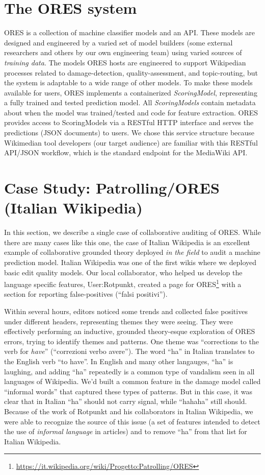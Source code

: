 \documentclass{sigchi-ext}
\begin{document}
\section{The ORES system}

ORES is a collection of machine classifier models and an API.  These models are designed and engineered by a varied set of model builders (some external researchers and others by our own engineering team) using varied sources of \emph{training data}.  The models ORES hosts are engineered to support Wikipedian processes related to damage-detection, quality-assessment, and topic-routing, but the system is adaptable to a wide range of other models. To make these models available for users, ORES implements a containerized \emph{ScoringModel}, representing a fully trained and tested prediction model.  All \emph{ScoringModels} contain metadata about when the model was trained/tested and code for feature extraction. ORES provides access to ScoringModels via a RESTful HTTP interface and serves the predictions (JSON documents) to users.  We chose this service structure because Wikimedian tool developers (our target audience) are familiar with this RESTful API/JSON workflow, which is the standard endpoint for the MediaWiki API.

\section{Case Study: Patrolling/ORES (Italian Wikipedia)}
In this section, we describe a single case of collaborative auditing of ORES.  While there are many cases like this one, the case of Italian Wikipedia is an excellent example of collaborative grounded theory deployed \emph{in the field} to audit a machine prediction model. Italian Wikipedia was one of the first wikis where we deployed basic edit quality models.  Our local collaborator, who helped us develop the language specific features, User:Rotpunkt, created a page for ORES\footnote{\url{https://it.wikipedia.org/wiki/Progetto:Patrolling/ORES}} with a section for reporting false-positives (``falsi positivi'').

Within several hours, editors noticed some trends and collected false positives under different headers, representing themes they were seeing.  They were effectively performing an inductive, grounded theory-esque exploration of ORES errors, trying to identify themes and patterns. One theme was ``corrections to the verb for \emph{have}'' (``correzioni verbo avere'').  The word ``ha'' in Italian translates to the English verb ``to have''.  In English and many other langauges, ``ha'' is laughing, and adding ``ha'' repeatedly is a common type of vandalism seen in all languages of Wikipedia.  We'd built a common feature in the damage model called ``informal words'' that captured these types of patterns.  But in this case, it was clear that in Italian ``ha'' should not carry signal, while ``hahaha'' still should. Because of the work of Rotpunkt and his collaborators in Italian Wikipedia, we were able to recognize the source of this issue (a set of features intended to detect the use of \emph{informal language} in articles) and to remove ``ha'' from that list for Italian Wikipedia.
\end{document}
